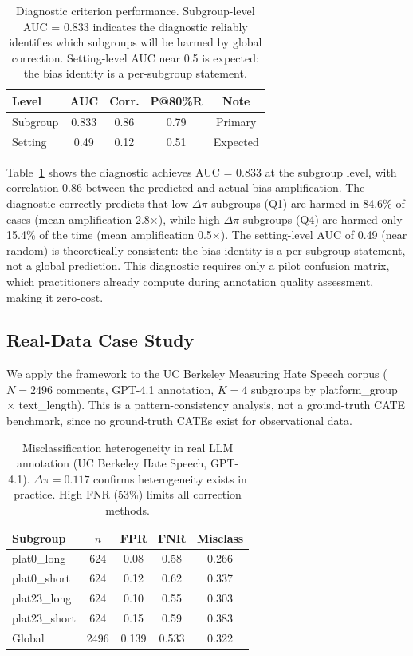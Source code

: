 \documentclass[11pt,twocolumn]{article}
\begin{document}
\begin{table}[t]
\centering
\caption{Diagnostic criterion performance. Subgroup-level AUC = 0.833 indicates the diagnostic reliably identifies which subgroups will be harmed by global correction. Setting-level AUC near 0.5 is expected: the bias identity is a per-subgroup statement.}
\label{tab:diagnostic}
\small
\begin{tabular}{@{}lcccc@{}}
\toprule
Level & AUC & Corr. & P@80\%R & Note \\
\midrule
Subgroup & 0.833 & 0.86 & 0.79 & Primary \\
Setting & 0.49 & 0.12 & 0.51 & Expected \\
\bottomrule
\end{tabular}
\end{table}

Table~\ref{tab:diagnostic} shows the diagnostic achieves AUC = 0.833 at the subgroup level, with correlation 0.86 between the predicted and actual bias amplification. The diagnostic correctly predicts that low-$\Delta\pi$ subgroups (Q1) are harmed in 84.6\% of cases (mean amplification 2.8$\times$), while high-$\Delta\pi$ subgroups (Q4) are harmed only 15.4\% of the time (mean amplification 0.5$\times$). The setting-level AUC of 0.49 (near random) is theoretically consistent: the bias identity is a per-subgroup statement, not a global prediction. This diagnostic requires only a pilot confusion matrix, which practitioners already compute during annotation quality assessment, making it zero-cost.

\subsection{Real-Data Case Study}
\label{sec:real_data}

We apply the framework to the UC Berkeley Measuring Hate Speech corpus \cite{kennedy2020} ($N\!=\!2496$ comments, GPT-4.1 annotation, $K\!=\!4$ subgroups by platform\_group $\times$ text\_length). This is a pattern-consistency analysis, not a ground-truth CATE benchmark, since no ground-truth CATEs exist for observational data.

\begin{table}[t]
\centering
\caption{Misclassification heterogeneity in real LLM annotation (UC Berkeley Hate Speech, GPT-4.1). $\Delta\pi = 0.117$ confirms heterogeneity exists in practice. High FNR (53\%) limits all correction methods.}
\label{tab:real_data}
\small
\begin{tabular}{@{}lcccc@{}}
\toprule
Subgroup & $n$ & FPR & FNR & Misclass \\
\midrule
plat0\_long & 624 & 0.08 & 0.58 & 0.266 \\
plat0\_short & 624 & 0.12 & 0.62 & 0.337 \\
plat23\_long & 624 & 0.10 & 0.55 & 0.303 \\
plat23\_short & 624 & 0.15 & 0.59 & 0.383 \\
Global & 2496 & 0.139 & 0.533 & 0.322 \\
\bottomrule
\end{tabular}
\end{table}
\end{document}
